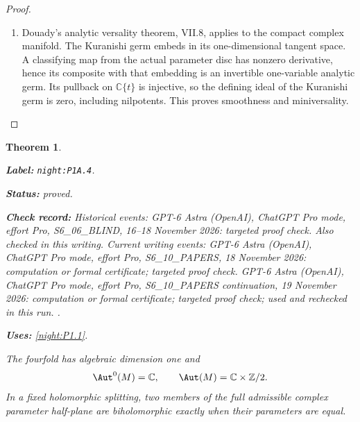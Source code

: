 \documentclass[11pt,a4paper]{article}
\newtheorem{theorem}{Theorem}[section]
\theoremstyle{definition}
\newcommand{\StatementRecord}[4]{\par\smallskip\begingroup\upshape\raggedright\noindent\textbf{Label:} \nolinkurl{#1}.\par\noindent\textbf{Status:} #2.\par\noindent\textbf{Check record:} #3.\par\noindent\textbf{Uses:} #4.\par\endgroup\smallskip}
\begin{document}
\begin{proof}
\begin{enumerate}[label=\arabic*.]
\item Douady's analytic versality theorem, VII.8, applies to the
compact complex manifold. The Kuranishi germ embeds in its
one-dimensional tangent space. A classifying map from the
actual parameter disc has nonzero derivative, hence its
composite with that embedding is an invertible one-variable
analytic germ. Its pullback on $\mathbb C\{t\}$ is injective,
so the defining ideal of the Kuranishi germ is zero, including
nilpotents. This proves smoothness and miniversality.

\end{enumerate}
\end{proof}




\begin{theorem}\label{night:P1A.4}
\StatementRecord{night:P1A.4}{proved}{Historical events: GPT-6 Astra (OpenAI), ChatGPT Pro mode, effort Pro, S6\_06\_BLIND, 16--18 November 2026: targeted proof check. Also checked in this writing. Current writing events: GPT-6 Astra (OpenAI), ChatGPT Pro mode, effort Pro, S6\_10\_PAPERS, 18 November 2026: computation or formal certificate; targeted proof check. GPT-6 Astra (OpenAI), ChatGPT Pro mode, effort Pro, S6\_10\_PAPERS continuation, 19 November 2026: computation or formal certificate; targeted proof check; used and rechecked in this run. }{\cref{night:P1.1}}
The fourfold has algebraic dimension one and
\[
\Aut^0(M)=\mathbb C,\qquad
\Aut(M)=\mathbb C\times\mathbb Z/2.
\]
In a fixed holomorphic splitting, two members of the full
admissible complex parameter half-plane are biholomorphic
exactly when their parameters are equal.
\end{theorem}
\end{document}
